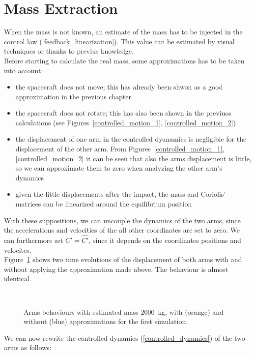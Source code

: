 \documentclass[a4paper,12pt,oneside]{report}
\begin{document}
\section{Mass Extraction}
When the mass is not known, an estimate of the mass has to be injected in the control law (\ref{feedback_linearization}). This value can be estimated by visual techniques or thanks to previus knowledge.\\
Before starting to calculate the real mass, some approximations has to be taken into account:
\begin{itemize}
  \item the spacecraft does not move; this has already been shwon as a good approximation in the previous chapter
  \item the spacecraft does not rotate; this has also been shown in the previuos calculations (see Figures~\ref{controlled_motion_1}, \ref{controlled_motion_2})
  \item the displacement of one arm in the controlled dyanamics is negligible for the displacement of the other arm. From Figures~\ref{controlled_motion_1}, \ref{controlled_motion_2} it can be seen that also the arms displacement is little, so we can approximate them to zero when analyzing the other arm's dynamics
  \item given the little displacements after the impact, the mass and Coriolis' matrices can be linearized around the equilibrium position
\end{itemize}
With these suppositions, we can uncouple the dynamics of the two arms, since the accelerations and velocities of the all other coordinates are set to zero. We can furthermore set $C'=\hat{C'}$, since it depends on the coordinates positions and velocites.\\
Figure~\ref{approximations} shows two time evolutions of the displacement of both arms with and without applying the approximation made above. The behaviour is almost identical.\\
\begin{figure}
  \centering
   \\
  \caption{Arms behaviours with estimated mass \SI{2000}{\kilogram}, with (orange) and without (blue) approximations for the first simulation.}
  \label{approximations}
\end{figure}
We can now rewrite the controlled dynamics (\ref{controlled_dynamics}) of the two arms as follows:
\end{document}
